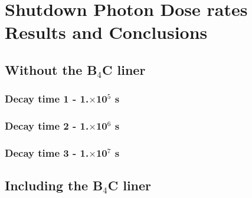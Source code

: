 \documentclass[12pt]{article}
\begin{document}
\section{Shutdown Photon Dose rates Results and Conclusions}
\subsection{Without the B$_4$C liner}
\subsubsection{Decay time 1 - 1.$\times$10$^5$ s}

\clearpage
\subsubsection{Decay time 2 - 1.$\times$10$^6$ s}

\clearpage
\subsubsection{Decay time 3 - 1.$\times$10$^7$ s}



\clearpage
\subsection{Including the B$_4$C liner}
\end{document}
